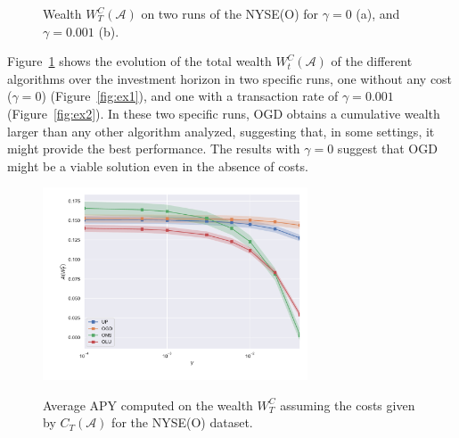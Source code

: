 \begin{figure}[ht!]
    \centering
\caption{Wealth $W_T^C(\mathcal{A})$ on two runs of the NYSE(O) for $\gamma = 0$ (a), and $\gamma = 0.001$ (b).} \label{fig:algo_copmarison}
\end{figure}

Figure~\ref{fig:algo_copmarison} shows the evolution of the total wealth ${W}^C_t(\mathcal{A})$ of the different algorithms over the investment horizon in two specific runs, one without any cost ($\gamma = 0$) (Figure~\ref{fig:ex1}), and one with a transaction rate of $\gamma = 0.001$ (Figure~\ref{fig:ex2}).
In these two specific runs, OGD obtains a cumulative wealth larger than any other algorithm analyzed, suggesting that, in some settings, it might provide the best performance.
The results with $\gamma = 0$ suggest that OGD might be a viable solution even in the absence of costs.


\begin{figure}[ht!]
\centering
{\includegraphics[width=0.70\textwidth,keepaspectratio]{img/fig_w_decay_l1.pdf}} 
\caption{Average APY computed on the wealth $W_T^C$ assuming the costs given by $C_T(\mathcal{A})$ for the NYSE(O) dataset.}
\label{fig:wealth_decay_l1}
\end{figure}

